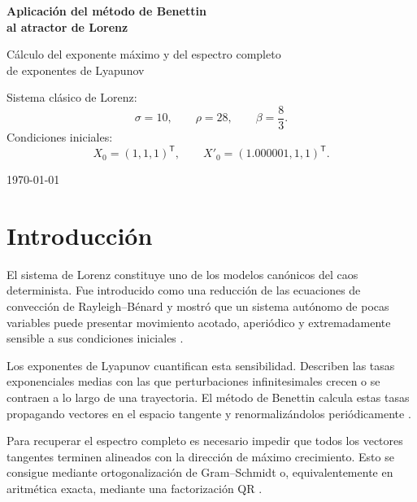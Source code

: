 \documentclass[12pt,a4paper,oneside]{report}
\theoremstyle{definition}
\numberwithin{equation}{chapter}
\newcommand{\trans}{\mathsf{T}}
\begin{document}
\begin{titlepage}
    \centering
    \vspace*{1.8cm}
    {\Huge\bfseries Aplicación del método de Benettin\\[0.25cm] al atractor de Lorenz\par}
    
    \vspace{0.7cm}
    {\Large Cálculo del exponente máximo y del espectro completo\\ de exponentes de Lyapunov\par}
    \vfill
    \begin{minipage}{0.95\textwidth}
        \centering
        Sistema clásico de Lorenz:
        \[
            \sigma=10,\qquad \rho=28,\qquad \beta=\frac{8}{3}.
        \]
        Condiciones iniciales:
        \[
            X_0=(1,1,1)^{\trans},\qquad X'_0=(1.000001,1,1)^{\trans}.
        \]
    \end{minipage}
    \vfill
    
    {\large \today\par}
\end{titlepage}

\tableofcontents
\clearpage

\chapter*{Introducción}

El sistema de Lorenz constituye uno de los modelos canónicos del caos determinista. Fue introducido como una reducción de las ecuaciones de convección de Rayleigh--Bénard y mostró que un sistema autónomo de pocas variables puede presentar movimiento acotado, aperiódico y extremadamente sensible a sus condiciones iniciales \cite{lorenz1963,kuznetsov2020}.

Los exponentes de Lyapunov cuantifican esta sensibilidad. Describen las tasas exponenciales medias con las que perturbaciones infinitesimales crecen o se contraen a lo largo de una trayectoria. El método de Benettin calcula estas tasas propagando vectores en el espacio tangente y renormalizándolos periódicamente \cite{benettin1980,skokos2010}.

Para recuperar el espectro completo es necesario impedir que todos los vectores tangentes terminen alineados con la dirección de máximo crecimiento. Esto se consigue mediante ortogonalización de Gram--Schmidt o, equivalentemente en aritmética exacta, mediante una factorización QR \cite{semenov2022,gatica2026}.
\end{document}
